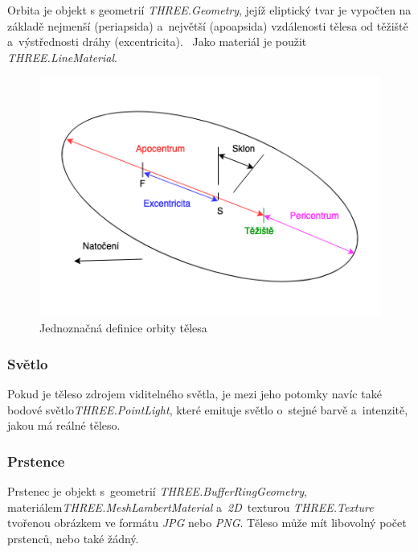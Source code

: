 \documentclass[a4paper,12pt]{article}
\begin{document}
Orbita je objekt s geometrií \textit{THREE.Geometry}, jejíž eliptický tvar je vypočten na základě nejmenší (periapsida) a~největší (apoapsida) vzdálenosti tělesa od těžiště  a~výstřednosti dráhy (excentricita).~\cite{kleczek} Jako materiál je použit \textit{THREE.LineMaterial}.




\begin{figure}[H]
\begin{center}
\includegraphics[width=350pt]{Images/OrbitData.png}
\caption[Jednoznačná definice orbity tělesa]{Jednoznačná definice orbity tělesa \footnotemark[1]}
\end{center}
\end{figure}

\subsubsection{Světlo}

Pokud je těleso zdrojem viditelného světla, je mezi jeho potomky navíc také bodové světlo\newline \textit{THREE.PointLight}, které emituje světlo o~stejné barvě a~intenzitě, jakou má reálné těleso.

\subsubsection{Prstence}

Prstenec je objekt s~geometrií \textit{THREE.BufferRingGeometry}, materiálem\newline \textit{THREE.MeshLambertMaterial} a~\textit{2D}~texturou \textit{THREE.Texture} tvořenou obrázkem ve formátu \textit{JPG} nebo \textit{PNG}. Těleso může mít libovolný počet prstenců, nebo také žádný.
\end{document}
